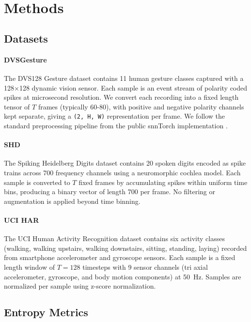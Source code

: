 \documentclass[conference]{IEEEtran}
\begin{document}
\section{Methods}

\subsection{Datasets}

\paragraph*{DVSGesture}
The DVS128 Gesture dataset contains 11 human gesture classes captured with a 128$\times$128 dynamic vision sensor. Each sample is an event stream of polarity coded spikes at microsecond resolution. We convert each recording into a fixed length tensor of $T$ frames (typically 60-80), with positive and negative polarity channels kept separate, giving a \texttt{(2, H, W)} representation per frame. We follow the standard preprocessing pipeline from the public snnTorch implementation \cite{dlarionov2021dvsgesture}.

\paragraph*{SHD}
The Spiking Heidelberg Digits dataset contains 20 spoken digits encoded as spike trains across 700 frequency channels using a neuromorphic cochlea model. Each sample is converted to $T$ fixed frames by accumulating spikes within uniform time bins, producing a binary vector of length 700 per frame. No filtering or augmentation is applied beyond time binning.

\paragraph*{UCI HAR}
The UCI Human Activity Recognition dataset contains six activity classes (walking, walking upstairs, walking downstairs, sitting, standing, laying) recorded from smartphone accelerometer and gyroscope sensors. Each sample is a fixed length window of $T=128$ timesteps with 9 sensor channels (tri axial accelerometer, gyroscope, and body motion components) at 50~Hz. Samples are normalized per sample using z-score normalization.

\subsection{Entropy Metrics}
\end{document}
